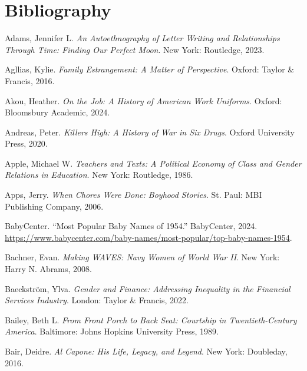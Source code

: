 \documentclass[
  american,
  letterpaper,
]{book}
\newlength{\cslhangindent}
\newenvironment{CSLReferences}[2] %
 {\begin{list}{}{%
  \setlength{\itemindent}{0pt}
  \setlength{\leftmargin}{0pt}
  \setlength{\parsep}{0pt}
  \ifodd #1
   \setlength{\leftmargin}{\cslhangindent}
   \setlength{\itemindent}{-1\cslhangindent}
  \fi
  \setlength{\itemsep}{#2\baselineskip}}}
 {\end{list}}
\begin{document}

\chapter*{Bibliography}\label{bibliography}


\protect{}\label{refs}
\begin{CSLReferences}{1}{0}
Adams, Jennifer L. \emph{An Autoethnography of Letter Writing and
Relationships Through Time: Finding Our Perfect Moon}. New York:
Routledge, 2023.

Agllias, Kylie. \emph{Family Estrangement: A Matter of Perspective}.
Oxford: Taylor \& Francis, 2016.

Akou, Heather. \emph{On the Job: A History of American Work Uniforms}.
Oxford: Bloomsbury Academic, 2024.

Andreas, Peter. \emph{Killers High: A History of War in Six Drugs}.
Oxford University Press, 2020.

Apple, Michael W. \emph{Teachers and Texts: A Political Economy of Class
and Gender Relations in Education}. New York: Routledge, 1986.

Apps, Jerry. \emph{When Chores Were Done: Boyhood Stories}. St. Paul:
MBI Publishing Company, 2006.

BabyCenter. {``Most Popular Baby Names of 1954.''} BabyCenter, 2024.
\url{https://www.babycenter.com/baby-names/most-popular/top-baby-names-1954}.

Bachner, Evan. \emph{Making WAVES: Navy Women of World War II}. New
York: Harry N. Abrams, 2008.

Baeckström, Ylva. \emph{Gender and Finance: Addressing Inequality in the
Financial Services Industry}. London: Taylor \& Francis, 2022.

Bailey, Beth L. \emph{From Front Porch to Back Seat: Courtship in
Twentieth-Century America}. Baltimore: Johns Hopkins University Press,
1989.

Bair, Deidre. \emph{Al Capone: His Life, Legacy, and Legend}. New York:
Doubleday, 2016.


\end{CSLReferences}
\end{document}

